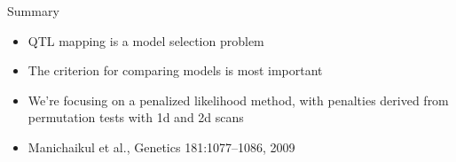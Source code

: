 \documentclass[12pt]{article}
\newcommand{\headsize}{\fontsize{35}{35} \selectfont}
\newcommand{\smallersize}{\fontsize{20}{25} \selectfont}
\begin{document}
\newpage

\headsize \color{myyellow}
\hfill \begin{minipage}{5.75in}
\centering
Summary
\end{minipage}

\vspace{3cm} \color{mywhite} \smallersize

\hfill \begin{minipage}{10in}

\begin{itemize}
\itemsep24pt
\item QTL mapping is a model selection problem
\item The criterion for comparing models is most important
\item We're focusing on a penalized likelihood method, with penalties
  derived from permutation tests with 1d and 2d scans
\item Manichaikul et al., Genetics 181:1077--1086, 2009
\end{itemize}

\end{minipage}
\end{document}
